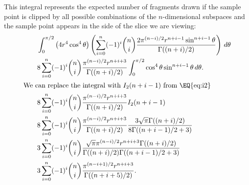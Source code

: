 \begin{lem}

This integral represents the expected number of fragments drawn if the sample
point is clipped by all possible combinations of the $n$-dimensional 
subspaces and the sample point appears in the side of the slice we are 
viewing:
\begin{align*}
  \qquad & \int_{0}^{\pi/2}
           \left(4r^4 \cos^4 \theta\right)
           \left(
             \sum_{i=0}^{n} (-1)^i {n \choose i}
                            \frac{2\pi^{(n-i)/2} r^{n+i-1} \sin^{n+i-1} \theta}
                                 {\Gamma((n+i)/2)} 
           \right) \, d\theta \\
  \qquad & 8 \sum_{i=0}^{n} (-1)^i {n \choose i}
                 \frac{\pi^{(n-i)/2} r^{n+i+3}}{\Gamma((n+i)/2)} 
           \int_{0}^{\pi/2} \cos^4 \theta \sin^{n+i-1} \theta \, d\theta \text{.} \\
\intertext{We can replace the integral with $I_2(n+i-1)$ from \EQ{eq:i2}}
  \qquad & 8 \sum_{i=0}^{n} (-1)^i {n \choose i}
                 \frac{\pi^{(n-i)/2} r^{n+i+3}}{\Gamma((n+i)/2)} 
           I_2(n+i-1) \\
  \qquad & 8 \sum_{i=0}^{n} (-1)^i {n \choose i}
                 \frac{\pi^{(n-i)/2} r^{n+i+3}}{\Gamma((n+i)/2)} 
           \frac{3\sqrt{\pi} \Gamma((n+i)/2)}{8\Gamma((n+i-1)/2+3)} \\
  \qquad & 3 \sum_{i=0}^{n}(-1)^i {n \choose i}
             \frac{\sqrt{\pi}\pi^{(n-i)/2} r^{n+i+3} \Gamma((n+i)/2)}
                  {\Gamma((n+i)/2) \Gamma((n+i-1)/2+3)} \\
  \qquad & 3 \sum_{i=0}^{n} (-1)^i {n \choose i}
             \frac{\pi^{(n-i+1)/2} r^{n+i+3}}
                  {\Gamma((n+i+5)/2)}
\text{.}
\end{align*}
\end{lem}

